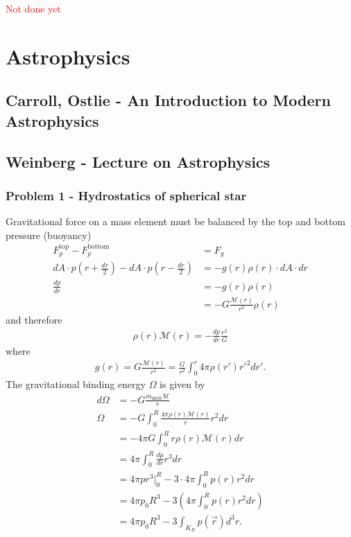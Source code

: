 \documentclass[10pt,a4paper]{article}
\theoremstyle{definition}
\begin{document}
\textcolor{red}{Not done yet}

\section{Astrophysics}
\subsection{{\sc Carroll, Ostlie} - An Introduction to Modern Astrophysics}
\subsection{{\sc Weinberg} - Lecture on Astrophysics}
\subsubsection{Problem 1 - Hydrostatics of spherical star}
Gravitational force on a mass element must be balanced by the top and bottom pressure (buoyancy)
\begin{align}
    F_p^\text{top}-F_p^\text{bottom}&=F_g\\
    dA\cdot p\left(r+\frac{dr}{2}\right)-dA\cdot p\left(r-\frac{dr}{2}\right)&=-g(r)\rho(r)\cdot dA\cdot dr\\
    \frac{dp}{dr} &=-g(r)\rho(r)\\
    &=-G\frac{\mathcal{M}(r)}{r^2}\rho(r)
\end{align}
and therefore
\begin{align}
   \rho(r)\mathcal{M}(r)=-\frac{dp}{dr}\frac{r^2}{G}
\end{align}
where
\begin{align}
    g(r)=G\frac{\mathcal{M}(r)}{r^2}=\frac{G}{r^2}\int_0^r4\pi\rho(r')r'^2dr'.
\end{align}
The gravitational binding energy $\Omega$ is given by
\begin{align}
    d\Omega&=-G\frac{m_\text{shell}\mathcal{M}}{r}\\
    \Omega&=-G\int_0^R\frac{4\pi\rho(r)\mathcal{M}(r)}{r}r^2dr\\
    &=-4\pi G\int_0^Rr\rho(r)\mathcal{M}(r)dr\\
    &=4\pi\int_0^R\frac{dp}{dr}r^3dr\\
    &=4\pi p r^3|_0^R - 3\cdot4\pi\int_0^Rp(r)r^2dr\\
    &=4\pi p_0 R^3 - 3\left(4\pi\int_0^Rp(r)r^2dr\right)\\
    &=4\pi p_0 R^3 - 3\int_{K_R}p(\vec{r})d^3r.
\end{align}
\end{document}
